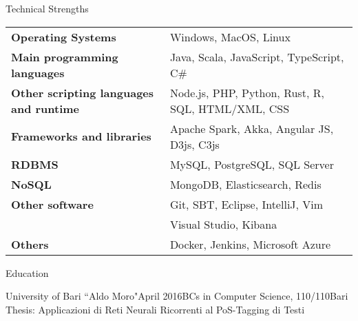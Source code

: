\documentclass{resume} %
\begin{document}

\begin{rSection}{Technical Strengths}

\begin{tabular}{ @{} >{\bfseries}l @{\hspace{6ex}} l }
Operating Systems & Windows, MacOS, Linux \\
Main programming languages & Java, Scala, JavaScript, TypeScript, C\# \\
Other scripting languages and runtime & Node.js, PHP, Python, Rust, R, SQL, HTML/XML, CSS \\
Frameworks and libraries & Apache Spark, Akka, Angular JS, D3js, C3js \\
RDBMS & MySQL, PostgreSQL, SQL Server \\
NoSQL & MongoDB, Elasticsearch, Redis \\
Other software & Git, SBT, Eclipse, IntelliJ, Vim \\
& Visual Studio, Kibana \\
Others & Docker, Jenkins, Microsoft Azure \\
\end{tabular}

\end{rSection}


\begin{rSection}{Education}

\begin{rSubsection}{University of Bari ``Aldo Moro"}{April 2016}{BCs in Computer Science, 110/110}{Bari}
Thesis: Applicazioni di Reti Neurali Ricorrenti al PoS-Tagging di Testi
\end{rSubsection}

\end{rSection}
\end{document}
